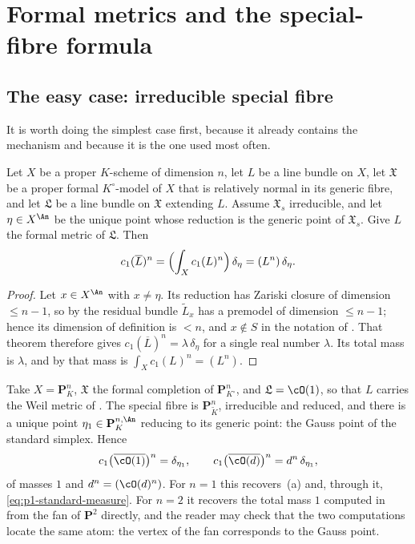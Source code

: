 \section{Formal metrics and the special-fibre formula}
\label{sec:ch17-formal}

\subsection{The easy case: irreducible special fibre}
\label{sec:ch17-good-reduction}

It is worth doing the simplest case first, because it already contains the
mechanism and because it is the one used most often.

\begin{proposition}
\label{prop:ch17-good-reduction}
Let $X$ be a proper $K$-scheme of dimension $n$, let $L$ be a line
bundle on $X$, let $\mathfrak X$ be a proper formal
$K^\circ$-model of $X$ that is relatively normal in its generic fibre,
and let $\mathfrak L$ be a line bundle on $\mathfrak X$ extending $L$.
Assume $\mathfrak X_s$ irreducible, and let $\eta\in X^{\An}$ be the
unique point whose reduction is the generic point of $\mathfrak X_s$.
Give $L$ the formal metric of $\mathfrak L$.  Then
\[
 c_1(\overline L)^n=\Bigl(\int_Xc_1(L)^n\Bigr)\,\delta_\eta
 =(L^n)\,\delta_\eta .
\]
\end{proposition}

\begin{proof}
Let $x\in X^{\An}$ with $x\ne\eta$.  Its reduction has Zariski closure
of dimension $\le n-1$, so by  the residual
bundle $\widetilde L_x$ has a premodel of dimension $\le n-1$; hence its
dimension of definition is $<n$, and $x\notin S$ in the notation of
.  That theorem therefore gives
$c_1(\overline L)^n=\lambda\,\delta_\eta$ for a single real number
$\lambda$.  Its total mass is $\lambda$, and by
 that mass is $\int_Xc_1(L)^n=(L^n)$.
\end{proof}

\begin{example}
\label{ex:ch17-projective-good-reduction}
Take $X=\mathbf P^n_K$, $\mathfrak X$ the formal completion of
$\mathbf P^n_{K^\circ}$, and $\mathfrak L=\cO(1)$, so that $L$ carries
the Weil metric of .  The special fibre is
$\mathbf P^n_{\widetilde K}$, irreducible and reduced, and there is a
unique point $\eta_1\in\mathbf P^{n,\An}_K$ reducing to its generic point:
the Gauss point of the standard simplex.  Hence
\[
 c_1\bigl(\overline{\cO(1)}\bigr)^n=\delta_{\eta_1},
 \qquad
 c_1\bigl(\overline{\cO(d)}\bigr)^n=d^n\,\delta_{\eta_1},
\]
of masses $1$ and $d^n=(\cO(d)^n)$.  For $n=1$ this recovers
\,(a) and, through it,
\eqref{eq:p1-standard-measure}.  For $n=2$ it recovers the total mass
$1$ computed in  from the fan of $\mathbf P^2$
directly, and the reader may check that the two computations locate the same
atom: the vertex of the fan corresponds to the Gauss point.
\end{example}

